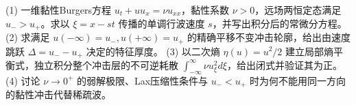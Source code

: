 (1) 一维黏性Burgers方程 \(u_t+uu_x=\nu u_{xx}\)，黏性系数 \(\nu>0\)，远场两恒定态满足 \(u_->u_+\)。求以 \(\xi=x-st\) 传播的单调行波速度 \(s\)，并写出积分后的常微分方程。
(2) 求满足 \(u(-\infty)=u_-,u(+\infty)=u_+\) 的精确平移不变冲击轮廓，给出由速度跳跃 \(\Delta=u_--u_+\) 决定的特征厚度。
(3) 以二次熵 \(\eta(u)=u^2/2\) 建立局部熵平衡式，独立积分整个冲击层的不可逆耗散 \(\int_{-\infty}^\infty\nu u_\xi^2d\xi\)，给出闭式并验证其为正。
(4) 讨论 \(\nu\to0^+\) 的弱解极限、Lax压缩性条件与 \(u_-<u_+\) 时为何不能用同一方向的黏性冲击代替稀疏波。
